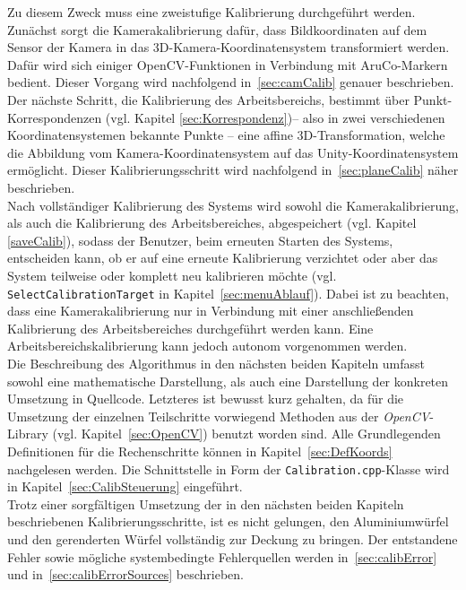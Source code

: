 Zu diesem Zweck muss eine zweistufige Kalibrierung durchgeführt werden. Zunächst sorgt die Kamerakalibrierung dafür, dass Bildkoordinaten auf dem Sensor der Kamera in das 3D-Kamera-Koordinatensystem transformiert werden. Dafür wird sich einiger OpenCV-Funktionen in Verbindung mit AruCo-Markern bedient. Dieser Vorgang wird nachfolgend in~\ref{sec:camCalib} genauer beschrieben.\\
Der nächste Schritt, die Kalibrierung des Arbeitsbereichs, bestimmt über Punkt-Korrespondenzen (vgl. Kapitel \ref{sec:Korrespondenz})-- also in zwei verschiedenen Koordinatensystemen bekannte Punkte -- eine affine 3D-Transformation, welche die Abbildung vom Kamera-Koordinaten\-system auf das Unity-Koordinatensystem ermöglicht. Dieser Kalibrierungsschritt wird nachfolgend in~\ref{sec:planeCalib} näher beschrieben.\\
Nach vollständiger Kalibrierung des Systems wird sowohl die Kamerakalibrierung, als auch die Kalibrierung des Arbeitsbereiches, abgespeichert (vgl. Kapitel \ref{saveCalib}), sodass der Benutzer, beim erneuten Starten des Systems, entscheiden kann, ob er auf eine erneute Kalibrierung verzichtet oder aber das System teilweise oder komplett neu kalibrieren möchte (vgl. \texttt{SelectCalibrationTarget} in Kapitel~\ref{sec:menuAblauf}). Dabei ist zu beachten, dass eine Kamerakalibrierung nur in Verbindung mit einer anschließenden Kalibrierung des Arbeitsbereiches durchgeführt werden kann. Eine Arbeitsbereichskalibrierung kann jedoch autonom vorgenommen werden. \\
Die Beschreibung des Algorithmus in den nächsten beiden Kapiteln umfasst sowohl eine mathematische Darstellung, als auch eine Darstellung der konkreten Umsetzung in Quellcode. Letzteres ist bewusst kurz gehalten, da für die Umsetzung der einzelnen Teilschritte vorwiegend Methoden aus der \textit{OpenCV}-Library (vgl. Kapitel~\ref{sec:OpenCV}) benutzt worden sind. Alle Grundlegenden Definitionen für die Rechenschritte können in Kapitel~\ref{sec:DefKoords} nachgelesen werden. Die Schnittstelle in Form der \texttt{Calibration.cpp}-Klasse wird in Kapitel~\ref{sec:CalibSteuerung} eingeführt.\\
Trotz einer sorgfältigen Umsetzung der in den nächsten beiden Kapiteln beschriebenen Kalibrierungsschritte, ist es nicht gelungen, den Aluminiumwürfel und den gerenderten Würfel vollständig zur Deckung zu bringen. Der entstandene Fehler sowie mögliche systembedingte Fehlerquellen werden in~\ref{sec:calibError} und in~\ref{sec:calibErrorSources} beschrieben. 

